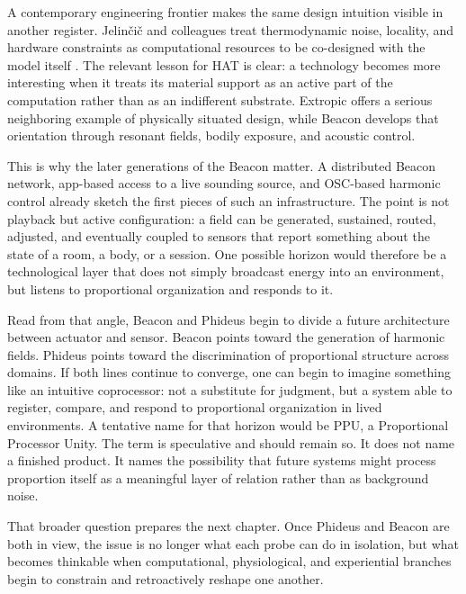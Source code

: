 A contemporary engineering frontier makes the same design intuition visible in another register. Jelin{\v{c}}i{\v{c}} and colleagues treat thermodynamic noise, locality, and hardware constraints as computational resources to be co-designed with the model itself \parencite{jelincic_2025}. The relevant lesson for HAT is clear: a technology becomes more interesting when it treats its material support as an active part of the computation rather than as an indifferent substrate. Extropic offers a serious neighboring example of physically situated design, while Beacon develops that orientation through resonant fields, bodily exposure, and acoustic control.

This is why the later generations of the Beacon matter. A distributed Beacon network, app-based access to a live sounding source, and OSC-based harmonic control already sketch the first pieces of such an infrastructure. The point is not playback but active configuration: a field can be generated, sustained, routed, adjusted, and eventually coupled to sensors that report something about the state of a room, a body, or a session. One possible horizon would therefore be a technological layer that does not simply broadcast energy into an environment, but listens to proportional organization and responds to it.

Read from that angle, Beacon and Phideus begin to divide a future architecture between actuator and sensor. Beacon points toward the generation of harmonic fields. Phideus points toward the discrimination of proportional structure across domains. If both lines continue to converge, one can begin to imagine something like an intuitive coprocessor: not a substitute for judgment, but a system able to register, compare, and respond to proportional organization in lived environments. A tentative name for that horizon would be PPU, a Proportional Processor Unity. The term is speculative and should remain so. It does not name a finished product. It names the possibility that future systems might process proportion itself as a meaningful layer of relation rather than as background noise.

That broader question prepares the next chapter. Once Phideus and Beacon are both in view, the issue is no longer what each probe can do in isolation, but what becomes thinkable when computational, physiological, and experiential branches begin to constrain and retroactively reshape one another.

